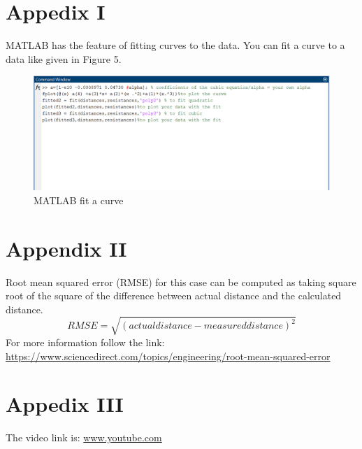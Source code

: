 \documentclass[letterpaper,12pt]{article}
\begin{document}
\section*{Appedix I}
MATLAB has the feature of fitting curves to the data. You can fit a curve to a data like given in Figure 5.
\begin{figure}[H]
	\centering
	\includegraphics[width=1\textwidth]{appendix.png}
	\caption{MATLAB fit a curve}
\end{figure}
\section*{Appendix II}
Root mean squared error (RMSE) for this case can be computed as taking square root of the square of the difference between actual distance and the calculated distance.
\[RMSE = \sqrt{(actualdistance - measureddistance)^2}\]
For more information follow the link: \url{https://www.sciencedirect.com/topics/engineering/root-mean-squared-error}
\section*{Appedix III}
The video link is: \url{www.youtube.com}
\end{document}
